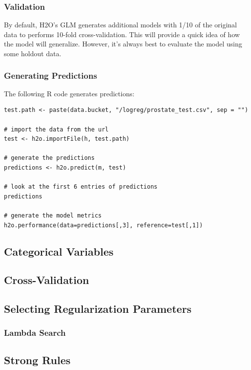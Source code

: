 \subsubsection{Validation}

By default, H2O's GLM generates additional models with 1/10 of the original data to performs 10-fold
cross-validation. This will provide a quick idea of how the model will generalize. However, it's always best to
evaluate the model using some holdout data.

\subsubsection{Generating Predictions}

The following R code generates predictions:

\begin{lstlisting}[style=R]
test.path <- paste(data.bucket, "/logreg/prostate_test.csv", sep = "")

# import the data from the url
test <- h2o.importFile(h, test.path)

# generate the predictions
predictions <- h2o.predict(m, test)

# look at the first 6 entries of predictions
predictions

# generate the model metrics
h2o.performance(data=predictions[,3], reference=test[,1])
\end{lstlisting}

\subsection{Categorical Variables}

\subsection{Cross-Validation}

\subsection{Selecting Regularization Parameters}

\subsubsection{Lambda Search}  %
    

\subsection{Strong Rules} %

